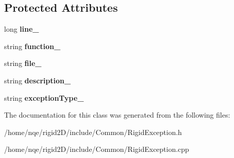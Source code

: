 \subsection*{Protected Attributes}
\begin{DoxyCompactItemize}
\item 
\hypertarget{class_rigid2_d_1_1_exception_afa55a45c62617861895f0a5ad449ed01}{
long {\bfseries line\_\-}}
\label{class_rigid2_d_1_1_exception_afa55a45c62617861895f0a5ad449ed01}

\item 
\hypertarget{class_rigid2_d_1_1_exception_aa6c0f798cc3521ce307a85a1f5eef9fb}{
string {\bfseries function\_\-}}
\label{class_rigid2_d_1_1_exception_aa6c0f798cc3521ce307a85a1f5eef9fb}

\item 
\hypertarget{class_rigid2_d_1_1_exception_a98223c8f937a2e595981c215c73101d2}{
string {\bfseries file\_\-}}
\label{class_rigid2_d_1_1_exception_a98223c8f937a2e595981c215c73101d2}

\item 
\hypertarget{class_rigid2_d_1_1_exception_aa3435717132104f897085c3cc39c789d}{
string {\bfseries description\_\-}}
\label{class_rigid2_d_1_1_exception_aa3435717132104f897085c3cc39c789d}

\item 
\hypertarget{class_rigid2_d_1_1_exception_a5aead98c27164132d5fd9a7395f34390}{
string {\bfseries exceptionType\_\-}}
\label{class_rigid2_d_1_1_exception_a5aead98c27164132d5fd9a7395f34390}

\end{DoxyCompactItemize}


The documentation for this class was generated from the following files:\begin{DoxyCompactItemize}
\item 
/home/nqe/rigid2D/include/Common/RigidException.h\item 
/home/nqe/rigid2D/include/Common/RigidException.cpp\end{DoxyCompactItemize}
